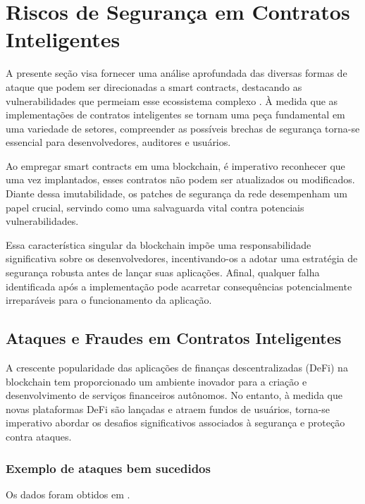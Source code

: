\chapter{\label{chap:chap3}Riscos de Segurança em Contratos Inteligentes}


A presente seção visa fornecer uma análise aprofundada das diversas formas de ataque que podem ser direcionadas a smart contracts, destacando as vulnerabilidades que permeiam esse ecossistema complexo \cite{SMAP}. À medida que as implementações de contratos inteligentes se tornam uma peça fundamental em uma variedade de setores, compreender as possíveis brechas de segurança torna-se essencial para desenvolvedores, auditores e usuários. 

 Ao empregar smart contracts em uma blockchain, é imperativo reconhecer que uma vez implantados, esses contratos não podem ser atualizados ou modificados. Diante dessa imutabilidade, os patches de segurança da rede desempenham um papel crucial, servindo como uma salvaguarda vital contra potenciais vulnerabilidades.

Essa característica singular da blockchain impõe uma responsabilidade significativa sobre os desenvolvedores, incentivando-os a adotar uma estratégia de segurança robusta antes de lançar suas aplicações. Afinal, qualquer falha identificada após a implementação pode acarretar consequências potencialmente irreparáveis para o funcionamento da aplicação.


\section{Ataques e Fraudes em Contratos Inteligentes}

A crescente popularidade das aplicações de finanças descentralizadas (DeFi) na blockchain tem proporcionado um ambiente inovador para a criação e desenvolvimento de serviços financeiros autônomos. No entanto, à medida que novas plataformas DeFi são lançadas e atraem fundos de usuários, torna-se imperativo abordar os desafios significativos associados à segurança e proteção contra ataques. 


\subsection{Exemplo de ataques bem sucedidos}
Os dados foram obtidos em \cite{RA}.

